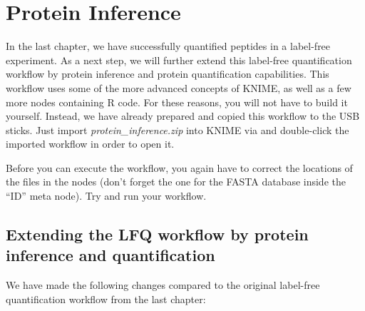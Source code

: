 \section{Protein Inference}

In the last chapter, we have successfully quantified peptides in a label-free experiment. As a next step, we will
further extend this label-free quantification workflow by protein inference and protein quantification capabilities.
This workflow uses some of the more advanced concepts of KNIME, as well as a few more nodes containing R code.
For these reasons, you will not have to build it yourself. Instead, we have already
prepared and copied this workflow to the USB sticks. Just import \textit{protein\_inference.zip} into KNIME
via  and double-click the imported workflow in order to open it.

Before you can execute the workflow, you again have to correct the locations of the files in the  nodes (don't forget
the one for the FASTA database inside the ``ID'' meta node). Try and run your workflow.

\subsection{Extending the LFQ workflow by protein inference and quantification}

We have made the following changes compared to the original label-free quantification workflow from the last chapter:

